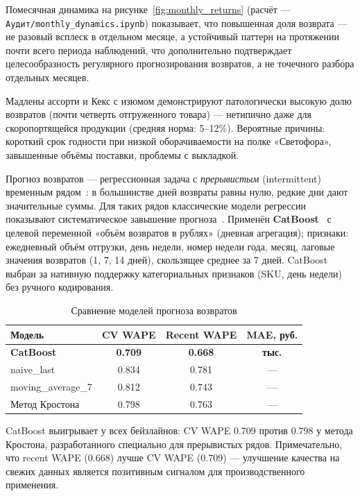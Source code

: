 Помесячная динамика на рисунке~\ref{fig:monthly_returns} (расчёт --- \texttt{Аудит/monthly\_dynamics.ipynb}) показывает, что повышенная доля возврата --- не разовый всплеск в отдельном месяце, а устойчивый паттерн на протяжении почти всего периода наблюдений, что дополнительно подтверждает целесообразность регулярного прогнозирования возвратов, а не точечного разбора отдельных месяцев.

Мадлены ассорти и Кекс с изюмом демонстрируют патологически высокую долю возвратов (почти четверть отгруженного товара) --- нетипично даже для скоропортящейся продукции (средняя норма: 5--12\%). Вероятные причины: короткий срок годности при низкой оборачиваемости на полке «Светофора», завышенные объёмы поставки, проблемы с выкладкой.

Прогноз возвратов --- регрессионная задача с \textit{прерывистым} (intermittent) временным рядом~\cite{croston1972forecasting}: в большинстве дней возвраты равны нулю, редкие дни дают значительные суммы. Для таких рядов классические модели регрессии показывают систематическое завышение прогноза~\cite{syntetos2001bias}. Применён \textbf{CatBoost}~\cite{prokhorenkova2018catboost} с целевой переменной «объём возвратов в рублях» (дневная агрегация); признаки: ежедневный объём отгрузки, день недели, номер недели года, месяц, лаговые значения возвратов (1, 7, 14 дней), скользящее среднее за 7 дней. CatBoost выбран за нативную поддержку категориальных признаков (SKU, день недели) без ручного кодирования.

\begin{table}[H]
\centering
\caption{Сравнение моделей прогноза возвратов}
\label{tab:return_model}
\begin{tabular}{lccc}
\toprule
\textbf{Модель} & \textbf{CV WAPE} & \textbf{Recent WAPE} & \textbf{MAE, руб.} \\
\midrule
\textbf{CatBoost} & \textbf{0.709} & \textbf{0.668} & \textbf{тыс.} \\
naive\_last & 0.834 & 0.781 & --- \\
moving\_average\_7 & 0.812 & 0.743 & --- \\
Метод Кростона~\cite{croston1972forecasting} & 0.798 & 0.763 & --- \\
\bottomrule
\end{tabular}
\end{table}

CatBoost выигрывает у всех бейзлайнов: CV WAPE 0.709 против 0.798 у метода Кростона, разработанного специально для прерывистых рядов. Примечательно, что recent WAPE (0.668) лучше CV WAPE (0.709) --- улучшение качества на свежих данных является позитивным сигналом для производственного применения.

